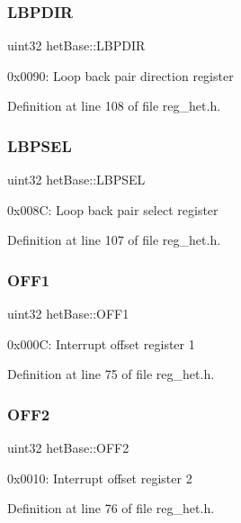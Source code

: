 \subsubsection{\texorpdfstring{L\+B\+P\+D\+IR}{LBPDIR}}
{\footnotesize\ttfamily uint32 het\+Base\+::\+L\+B\+P\+D\+IR}

0x0090\+: Loop back pair direction register 

Definition at line 108 of file reg\+\_\+het.\+h.

\mbox{\label{structhetBase_a9f70379175b2e4af2465d3c1ea11334e}} 
\subsubsection{\texorpdfstring{L\+B\+P\+S\+EL}{LBPSEL}}
{\footnotesize\ttfamily uint32 het\+Base\+::\+L\+B\+P\+S\+EL}

0x008C\+: Loop back pair select register 

Definition at line 107 of file reg\+\_\+het.\+h.

\mbox{\label{structhetBase_a11659ceeb8b0e0c00267a9a8c726e8a3}} 
\subsubsection{\texorpdfstring{O\+F\+F1}{OFF1}}
{\footnotesize\ttfamily uint32 het\+Base\+::\+O\+F\+F1}

0x000C\+: Interrupt offset register 1 

Definition at line 75 of file reg\+\_\+het.\+h.

\mbox{\label{structhetBase_ab01cc545d16ca7092c45ba8380142adc}} 
\subsubsection{\texorpdfstring{O\+F\+F2}{OFF2}}
{\footnotesize\ttfamily uint32 het\+Base\+::\+O\+F\+F2}

0x0010\+: Interrupt offset register 2 

Definition at line 76 of file reg\+\_\+het.\+h.

